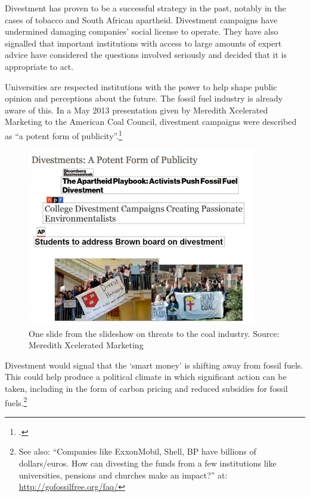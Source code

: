 \documentclass[10pt]{article}
\begin{document}
Divestment has proven to be a successful strategy in the past, notably in the cases of tobacco and South African apartheid.
Divestment campaigns have undermined damaging companies' social license to operate.
They have also signalled that important institutions with access to large amounts of expert advice have considered the questions involved seriously and decided that it is appropriate to act.



Universities are respected institutions with the power to help shape public opinion and perceptions about the future.
The fossil fuel industry is already aware of this.
In a May 2013 presentation given by Meredith Xcelerated Marketing to the American Coal Council, divestment campaigns were described as ``a potent form of publicity''.\footcite[][]{PotentPublicity}



\begin{figure}[h]
\includegraphics[width=100mm]{s7-divest-slide.png}
\centering
\caption{One slide from the slideshow on threats to the coal industry. Source: Meredith Xcelerated Marketing}
\label{fig:DivestSlide}
\end{figure}




Divestment would signal that the `smart money' is shifting away from fossil fuels. 
This could help produce a political climate in which significant action can be taken, including in the form of carbon pricing and reduced subsidies for fossil fuels.\footnote{See also: ``Companies like ExxonMobil, Shell, BP have billions of dollars/euros. How can divesting the funds from a few institutions like universities, pensions and churches make an impact?'' at: \url{http://gofossilfree.org/faq/}}
\end{document}
